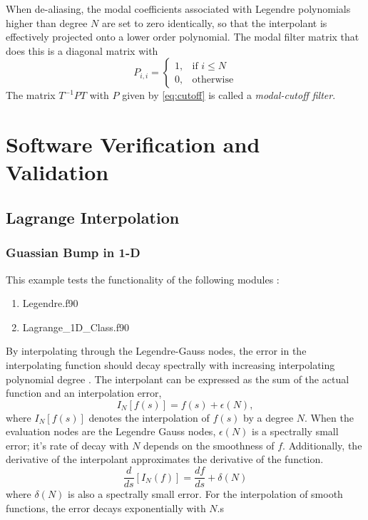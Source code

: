 \documentclass[12pt]{softwaremanual}
\begin{document}
When de-aliasing, the modal coefficients associated with Legendre polynomials higher than degree $N$ are set to zero identically, so that the interpolant is effectively projected onto a lower order polynomial. The modal filter matrix that does this is a diagonal matrix with
\begin{equation}
P_{i,i} = 
\begin{cases}
     1, & \text{if } i \leq N \\
     0, & \text{otherwise}
\end{cases}\label{eq:cutoff}
\end{equation}
The matrix $T^{-1}PT$ with $P$ given by \eqref{eq:cutoff} is called a \textit{modal-cutoff filter}.

\chapter{Software Verification and Validation}
\section{Lagrange Interpolation}

\subsection{ Guassian Bump in 1-D }
 This example tests the functionality of the following modules :
 \begin{enumerate}
 \item Legendre.f90
 \item Lagrange\_1D\_Class.f90
 \end{enumerate}
 By interpolating through the Legendre-Gauss nodes, the error in the interpolating function should decay spectrally with increasing interpolating polynomial degree \citep{Kopriva2009}. The interpolant can be expressed as the sum of the actual function and an interpolation error, 
\begin{equation}
I_N[ f(s) ] = f(s)  + \epsilon(N),
\end{equation} 
where $I_N[ f(s) ]$ denotes the interpolation of $f(s)$ by a degree $N$. When the evaluation nodes are the Legendre Gauss nodes, $\epsilon(N)$ is a spectrally small error; it's rate of decay with $N$ depends on the smoothness of $f$. Additionally, the derivative of the interpolant approximates the derivative of the function. 
  \begin{equation}
  \frac{d}{ds}[ I_N(f) ] = \frac{df}{ds} + \delta(N)
  \end{equation}
 where $\delta(N)$ is also a spectrally small error. For the interpolation of smooth functions, the error decays exponentially with $N$.s
 
\end{document}
